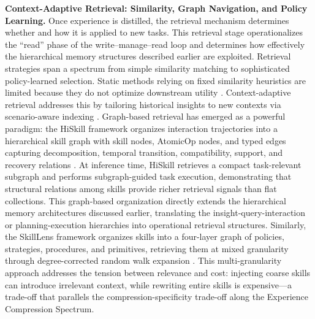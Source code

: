 \documentclass[11pt]{article}
\begin{document}
\textbf{Context-Adaptive Retrieval: Similarity, Graph Navigation, and Policy Learning.} Once experience is distilled, the retrieval mechanism determines whether and how it is applied to new tasks. This retrieval stage operationalizes the ``read'' phase of the write--manage--read loop and determines how effectively the hierarchical memory structures described earlier are exploited. Retrieval strategies span a spectrum from simple similarity matching to sophisticated policy-learned selection. Static methods relying on fixed similarity heuristics are limited because they do not optimize downstream utility \cite{ref135}. Context-adaptive retrieval addresses this by tailoring historical insights to new contexts via scenario-aware indexing \cite{ref131}. Graph-based retrieval has emerged as a powerful paradigm: the HiSkill framework organizes interaction trajectories into a hierarchical skill graph with skill nodes, AtomicOp nodes, and typed edges capturing decomposition, temporal transition, compatibility, support, and recovery relations \cite{ref136}. At inference time, HiSkill retrieves a compact task-relevant subgraph and performs subgraph-guided task execution, demonstrating that structural relations among skills provide richer retrieval signals than flat collections. This graph-based organization directly extends the hierarchical memory architectures discussed earlier, translating the insight-query-interaction or planning-execution hierarchies into operational retrieval structures. Similarly, the SkillLens framework organizes skills into a four-layer graph of policies, strategies, procedures, and primitives, retrieving them at mixed granularity through degree-corrected random walk expansion \cite{ref137}. This multi-granularity approach addresses the tension between relevance and cost: injecting coarse skills can introduce irrelevant context, while rewriting entire skills is expensive---a trade-off that parallels the compression-specificity trade-off along the Experience Compression Spectrum.
\end{document}
